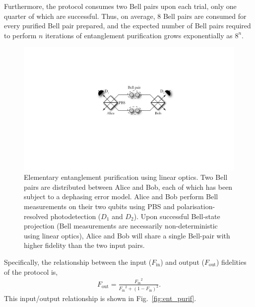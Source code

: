 \documentclass[aps,rmp,twocolumn,amsmath,amssymb,nofootinbib,superscriptaddress,longbibliography,floatfix]{revtex4-1}
\begin{document}
Furthermore, the protocol consumes two Bell pairs upon each trial, only one quarter of which are successful. Thus, on average, 8 Bell pairs are consumed for every purified Bell pair prepared, and the expected number of Bell pairs required to perform $n$ iterations of entanglement purification grows exponentially as $8^n$.

\begin{figure}[!htb]
\includegraphics[width=0.9\columnwidth]{ent_purif_prot}
\caption{Elementary entanglement purification using linear optics. Two Bell pairs are distributed between Alice and Bob, each of which has been subject to a dephasing error model. Alice and Bob perform Bell measurements on their two qubits using PBS and polarisation-resolved photodetection ($D_1$ and $D_2$). Upon successful Bell-state projection (Bell measurements are necessarily non-deterministic using linear optics), Alice and Bob will share a single Bell-pair with higher fidelity than the two input pairs.} \label{fig:ent_purif_prot}
\end{figure}

Specifically, the relationship between the input ($F_\mathrm{in}$) and output ($F_\mathrm{out}$) fidelities of the protocol is,
\begin{align}
F_\mathrm{out} = \frac{{F_\mathrm{in}}^2}{{F_\mathrm{in}}^2 + (1-F_\mathrm{in})^2}.
\end{align}
This input/output relationship is shown in Fig.~\ref{fig:ent_purif}.
\end{document}
